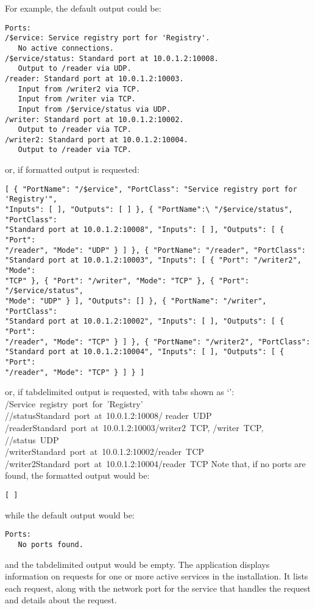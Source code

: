 For example, the default output could be:
\outputBegin
\begin{verbatim}
Ports:
/$ervice: Service registry port for 'Registry'.
   No active connections.
/$ervice/status: Standard port at 10.0.1.2:10008.
   Output to /reader via UDP.
/reader: Standard port at 10.0.1.2:10003.
   Input from /writer2 via TCP.
   Input from /writer via TCP.
   Input from /$ervice/status via UDP.
/writer: Standard port at 10.0.1.2:10002.
   Output to /reader via TCP.
/writer2: Standard port at 10.0.1.2:10004.
   Output to /reader via TCP.
\end{verbatim}
\outputEnd
\condPage{}
or, if \json\longDash{}formatted output is requested:
\outputBegin
\begin{verbatim}
[ { "PortName": "/$ervice", "PortClass": "Service registry port for 'Registry'",
"Inputs": [ ], "Outputs": [ ] }, { "PortName":\ "/$ervice/status", "PortClass":
"Standard port at 10.0.1.2:10008", "Inputs": [ ], "Outputs": [ { "Port":
"/reader", "Mode": "UDP" } ] }, { "PortName": "/reader", "PortClass":
"Standard port at 10.0.1.2:10003", "Inputs": [ { "Port": "/writer2", "Mode":
"TCP" }, { "Port": "/writer", "Mode": "TCP" }, { "Port": "/$ervice/status",
"Mode": "UDP" } ], "Outputs": [] }, { "PortName": "/writer", "PortClass":
"Standard port at 10.0.1.2:10002", "Inputs": [ ], "Outputs": [ { "Port":
"/reader", "Mode": "TCP" } ] }, { "PortName": "/writer2", "PortClass":
"Standard port at 10.0.1.2:10004", "Inputs": [ ], "Outputs": [ { "Port":
"/reader", "Mode": "TCP" } ] } ]
\end{verbatim}
\outputEnd{}
or, if tab\longDash{}delimited output is requested, with tabs shown as `\tabSymbol':
\outputBegin{}
/\dollarService\pseudotab{}Service~registry~port~for~'Registry'\\		
/\dollarService/status\pseudotab{}Standard~port~at~10.0.1.2:10008\pseudotab/%
reader~UDP\\
/reader\pseudotab{}Standard~port~at~10.0.1.2:10003\pseudotab/writer2~TCP,
/writer~TCP,\\
\hspace*{2em}/\dollarService/status~UDP\\
/writer\pseudotab{}Standard~port~at~10.0.1.2:10002\pseudotab/reader~TCP\\
/writer2\pseudotab{}Standard~port~at~10.0.1.2:10004\pseudotab/reader~TCP
\outputEnd{}
Note that, if no ports are found, the \json\longDash{}formatted output would be:
\outputBegin
\begin{verbatim}
[ ]
\end{verbatim}
\outputEnd{}
while the default output would be:
\outputBegin
\begin{verbatim}
Ports:
   No ports found.
\end{verbatim}
\outputEnd{}
and the tab\longDash{}delimited output would be empty.
The application  displays information on requests for one or
more active services in the \mplusm{} installation.
It lists each request, along with the \yarp{} network port for the service that handles
the request and details about the request.\\

